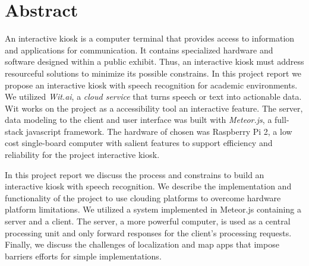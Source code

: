 %
\chapter*{Abstract}
\label{sec:abstract}
\vspace*{-10mm}


An interactive kiosk is a computer terminal that provides access to information and applications for communication.
It contains specialized hardware and software designed within a public exhibit.
Thus, an interactive kiosk must address resourceful solutions to minimize its possible constrains.
In this project report we propose an interactive kiosk with speech recognition for academic environments.
We utilized \emph{Wit.ai}, a \emph{cloud service} that turns speech or text into actionable data.
Wit works on the project as a accessibility tool an interactive feature.
The server, data modeling to the client and user interface was built with \emph{Meteor.js}, a full-stack javascript framework.
The hardware of chosen was Raspberry Pi 2, a low cost single-board computer with salient features to support efficiency and reliability for the project interactive kiosk.

In this project report we discuss the process and constrains to build an interactive kiosk with speech recognition.
We describe the implementation and functionality of the project to use clouding platforms to overcome hardware platform limitations.
We utilized a system implemented in Meteor.js containing a server and a client.
The server, a more powerful computer, is used as a central processing unit and only forward responses for the client's processing requests.
Finally, we discuss the challenges of localization and map apps that impose barriers efforts for simple implementations.